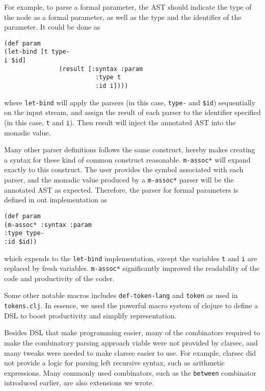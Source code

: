 \documentclass[12pt]{article}
\begin{document}
For example, to parse a formal parameter, the AST should indicate the type of
the node as a formal parameter, as well as the type and the identifier of the
parameter. It could be done as

\begin{samepage}
\begin{verbatim}
(def param
(let-bind [t type-
i $id]
               (result [:syntax :param
                         :type t
                         :id i])))
\end{verbatim}
\end{samepage}

\noindent where \texttt{let-bind} will apply the parsers (in this case,
\texttt{type-} and \verb'$id') sequentially on the input stream, and assign the
result of each parser to the identifier specified (in this case, \texttt{t} and
\texttt{i}). Then result will inject the annotated AST into the monadic value.

Many other parser definitions follows the same construct, hereby makes creating
a syntax for these kind of common construct reasonable. \texttt{m-assoc*} will
expand exactly to this construct. The user provides the symbol associated with
each parser, and the monadic value produced by a \texttt{m-assoc*} parser will
be the annotated AST as expected. Therefore, the parser for formal parameters is
defined in out implementation as

\begin{samepage}
\begin{verbatim}
(def param
(m-assoc* :syntax :param
:type type-
:id $id))
\end{verbatim}
\end{samepage}

\noindent which expends to the \texttt{let-bind} implementation, except the
variables \texttt{t} and \texttt{i} are replaced by fresh
variables. \texttt{m-assoc*} significantly improved the readability of the code
and productivity of the coder.

Some other notable macros includes \texttt{def-token-lang} and \texttt{token} as
used in \texttt{tokens.clj}. In essence, we used the powerful macro system of
clojure to define a DSL to boost productivity and simplify representation.

Besides DSL that make programming easier, many of the combinators required to
make the combinatory parsing approach viable were not provided by clarsec, and
many tweaks were needed to make clarsec easier to use. For example, clarsec did
not provide a logic for parsing left recursive syntax, such as arithmetic
expressions. Many commonly used combinators, such as the \texttt{between}
combinator introduced earlier, are also extensions we wrote.
\end{document}
